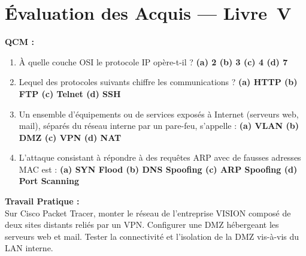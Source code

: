 \section{Évaluation des Acquis --- Livre~V}

\begin{boxexo}
\textbf{QCM :}
\begin{enumerate}
    \item À quelle couche OSI le protocole IP opère-t-il ? \textbf{(a) 2 \quad (b) 3 \quad (c) 4 \quad (d) 7}
    \item Lequel des protocoles suivants chiffre les communications ? \textbf{(a) HTTP \quad (b) FTP \quad (c) Telnet \quad (d) SSH}
    \item Un ensemble d'équipements ou de services exposés à Internet (serveurs web, mail), séparés du réseau interne par un pare-feu, s'appelle : \textbf{(a) VLAN \quad (b) DMZ \quad (c) VPN \quad (d) NAT}
    \item L'attaque consistant à répondre à des requêtes ARP avec de fausses adresses MAC est : \textbf{(a) SYN Flood \quad (b) DNS Spoofing \quad (c) ARP Spoofing \quad (d) Port Scanning}
\end{enumerate}

\textbf{Travail Pratique :}\\
Sur Cisco Packet Tracer, monter le réseau de l'entreprise VISION composé de deux sites distants reliés par un VPN. Configurer une DMZ hébergeant les serveurs web et mail. Tester la connectivité et l'isolation de la DMZ vis-à-vis du LAN interne.
\end{boxexo}

